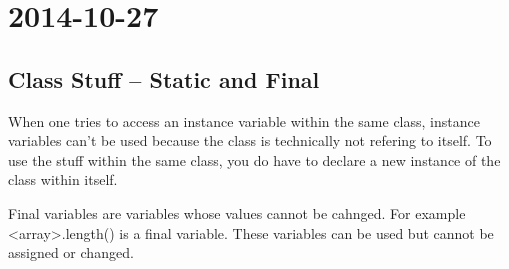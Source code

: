 \documentclass [12 pt, twoside] {article}
\begin{document}
\section{2014-10-27}
\subsection{Class Stuff -- Static and Final}


When one tries to access an instance variable within the same class,
instance variables can't be used because the class is technically
not refering to itself. To use the stuff within the same class, you
do have to declare a new instance of the class within itself.


Final variables are variables whose values cannot be cahnged. For example
<array>.length() is a final variable. These variables can be used but
cannot be assigned or changed. 
\end{document}

